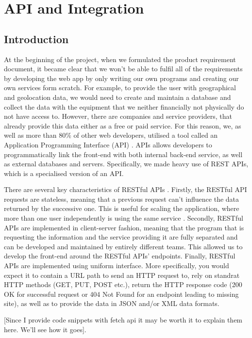 \section{API and Integration}
\subsection{Introduction}

At the beginning of the project, when we formulated the product requirement document, it became clear that we won't be able to fulfil all of the requirements by developing the web app by only writing our own programs and creating our own services form scratch. For example, to provide the user with geographical and geolocation data, we would need to create and maintain a database and collect the data with the equipment that we neither financially not physically do not have access to. However, there are companies and service providers, that already provide this data either as a free or paid service. For this reason, we, as well as more than 80\% of other web developers, utilised a tool called an Application Programming Interface (API) \cite{what-is-an-api}. APIs allows developers to programmatically link the front-end with both internal back-end service, as well as external databases and servers. Specifically, we made heavy use of REST APIs, which is a specialised version of an API.

There are several key characteristics of RESTful APIs \cite{rest-api-introduction}. Firstly, the RESTful API requests are stateless, meaning that a previous request can't influence the data returned by the successive one.  This is useful for scaling the application, where more than one user independently is using the same service \cite{app-scaling}. Secondly, RESTful APIs are implemented in client-server fashion, meaning that the program that is requesting the information and the service providing it are fully separated and can be developed and maintained by entirely different teams. This allowed us to develop the front-end around the RESTful APIs' endpoints. Finally, RESTful APIs are implemented using uniform interface. More specifically, you would expect it to contain a URL path to send an HTTP request to, rely on standrat HTTP methods (GET, PUT, POST etc.), return the HTTP response code (200 OK for successful request or 404 Not Found for an endpoint leading to missing site), as well as to provide the data in JSON and/or XML data formats. 

[Since I provide code snippets with fetch api it may be worth it to explain them here. We'll see how it goes].

